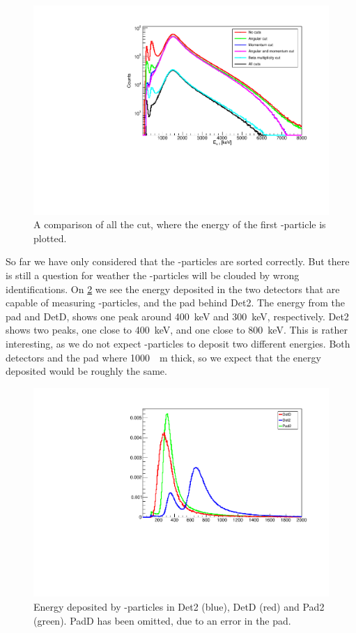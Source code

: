 \begin{figure}[h]
	\centering
	\includegraphics[width=\linewidth]{../figures/cutCompare.pdf}
	\caption{A comparison of all the cut, where the energy of the first \al-particle is plotted. }
	\label{fig:allCutsCompare}
\end{figure}

So far we have only considered that the \al-particles are sorted correctly. But there is still a question for weather the \be-particles will be clouded by wrong identifications. 
On \cref{fig:beSpectrum} we see the energy deposited in the two detectors that are capable of measuring \be-particles, and the pad behind Det2.
The energy from the pad and DetD, shows one peak around \SI{400}{keV} and \SI{300}{keV}, respectively. 
Det2 shows two peaks, one close to \SI{400}{keV}, and one close to \SI{800}{keV}. This is rather interesting, as we do not expect \be-particles to deposit two different energies. Both detectors and the pad where \SI{1000}{\mu m} thick, so we expect that the energy deposited would be roughly the same. 



\begin{figure}[h]
	\centering
	\includegraphics[width=\linewidth]{../figures/betaSpec.pdf}
	\caption{Energy deposited by \be-particles in Det2 (blue), DetD (red) and Pad2 (green). PadD has been omitted, due to an error in the pad.}
	\label{fig:beSpectrum}
\end{figure}

